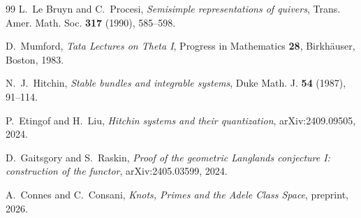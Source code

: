 \documentclass[11pt]{amsart}
\numberwithin{equation}{section}
\theoremstyle{definition}
\begin{document}
\begin{thebibliography}{99}
L.~Le Bruyn and C.~Procesi,
\emph{Semisimple representations of quivers},
Trans. Amer. Math. Soc. \textbf{317} (1990), 585--598.

D.~Mumford,
\emph{Tata Lectures on Theta I},
Progress in Mathematics \textbf{28}, Birkh\"auser, Boston, 1983.

N.~J.~Hitchin,
\emph{Stable bundles and integrable systems},
Duke Math. J. \textbf{54} (1987), 91--114.

P.~Etingof and H.~Liu,
\emph{Hitchin systems and their quantization},
arXiv:2409.09505, 2024.

D.~Gaitsgory and S.~Raskin,
\emph{Proof of the geometric Langlands conjecture I: construction of the
functor},
arXiv:2405.03599, 2024.


A.~Connes and C.~Consani,
\emph{Knots, Primes and the Adele Class Space},
preprint, 2026.

\end{thebibliography}
\end{document}
